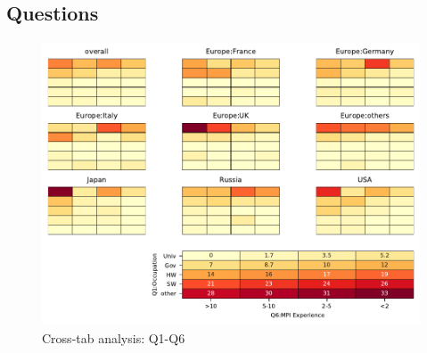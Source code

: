 
\subsection{Questions}


\begin{figure}
\begin{center}
\includegraphics[width=12cm]{../pdfs/Q1-Q6.pdf}
\caption{Cross-tab analysis: Q1-Q6}
\label{fig:Q1-Q6}
\end{center}
\end{figure}
